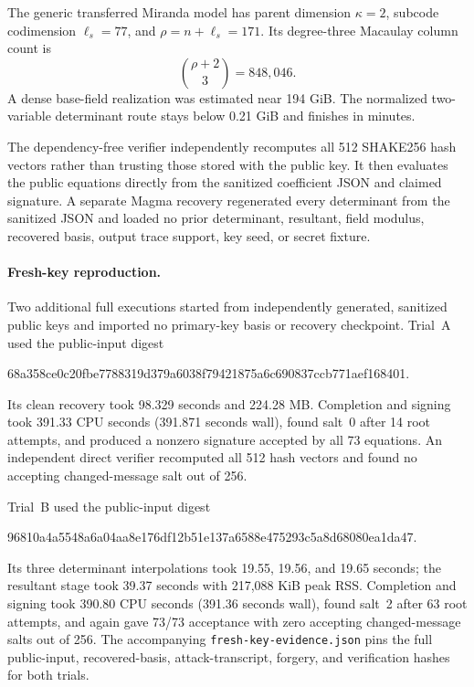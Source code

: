 \documentclass[10pt,a4paper]{article}
\begin{document}
The generic transferred Miranda model has parent dimension $\kappa=2$,
subcode codimension $\ell_s=77$, and $\rho=n+\ell_s=171$.  Its degree-three
Macaulay column count is
\[
                 \binom{\rho+2}{3}=848{,}046.
\]
A dense base-field realization was estimated near 194 GiB.  The normalized
two-variable determinant route stays below 0.21 GiB and finishes in minutes.

The dependency-free verifier independently recomputes all 512 SHAKE256 hash
vectors rather than trusting those stored with the public key.  It then
evaluates the public equations directly from the sanitized coefficient JSON
and claimed signature.  A separate Magma recovery regenerated every
determinant from the sanitized JSON and loaded no prior determinant,
resultant, field modulus, recovered basis, output trace support, key seed, or
secret fixture.

\paragraph{Fresh-key reproduction.}
Two additional full executions started from independently generated,
sanitized public keys and imported no primary-key basis or recovery
checkpoint.  Trial~A used the public-input digest
\begin{center}
\small\ttfamily
68a358ce0c20fbe7788319d379a6038f79421875a6c690837ccb771aef168401.
\end{center}
Its clean recovery took 98.329 seconds and 224.28 MB.  Completion and signing
took 391.33 CPU seconds (391.871 seconds wall), found salt~0 after 14 root
attempts, and produced a nonzero signature accepted by all 73 equations.  An
independent direct verifier recomputed all 512 hash vectors and found no
accepting changed-message salt out of 256.

Trial~B used the public-input digest
\begin{center}
\small\ttfamily
96810a4a5548a6a04aa8e176df12b51e137a6588e475293c5a8d68080ea1da47.
\end{center}
Its three determinant interpolations took 19.55, 19.56, and 19.65 seconds;
the resultant stage took 39.37 seconds with 217,088 KiB peak RSS.  Completion
and signing took 390.80 CPU seconds (391.36 seconds wall), found salt~2 after
63 root attempts, and again gave 73/73 acceptance with zero accepting
changed-message salts out of 256.  The accompanying
\texttt{fresh-key-evidence.json} pins the full public-input, recovered-basis,
attack-transcript, forgery, and verification hashes for both trials.
\end{document}
